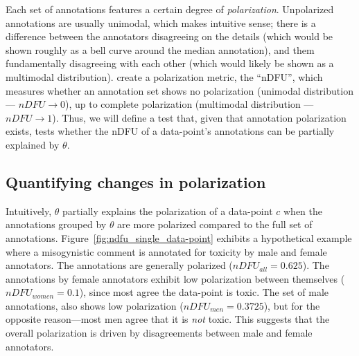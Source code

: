 \documentclass{article}
\begin{document}
Each set of annotations features a certain degree of \textit{polarization}. Unpolarized annotations are usually unimodal, which makes intuitive sense; there is a difference between the annotators disagreeing on the details (which would be shown roughly as a bell curve around the median annotation), and them fundamentally disagreeing with each other (which would likely be shown as a multimodal distribution). \textcite{pavlopoulos-likas-2024} create a polarization metric, the ``\ac{nDFU}'', which measures whether an annotation set shows no polarization (unimodal distribution --- $nDFU \rightarrow 0$), up to complete polarization (multimodal distribution --- $nDFU \rightarrow 1$). Thus, we will define a test that, given that annotation polarization exists, tests whether the \ac{nDFU} of a data-point's annotations can be partially explained by $\theta$.


\subsection{Quantifying changes in polarization}
\label{ssec:methodology:intuition}

Intuitively, $\theta$ partially explains the polarization of a data-point $c$ when the annotations grouped by $\theta$ are more polarized compared to the full set of annotations. Figure~\ref{fig:ndfu_single_data-point} exhibits a hypothetical example where a misogynistic comment is annotated for toxicity by male and female annotators. The annotations are generally polarized ($nDFU_{all} = 0.625$). The annotations by female annotators exhibit low polarization between themselves ($nDFU_{women} = 0.1$), since most agree the data-point is toxic. The set of male annotations, also shows low polarization ($nDFU_{men} = 0.3725$), but for the opposite reason---most men agree that it is \emph{not} toxic. This suggests that the overall polarization is driven by disagreements between male and female annotators.
\end{document}
